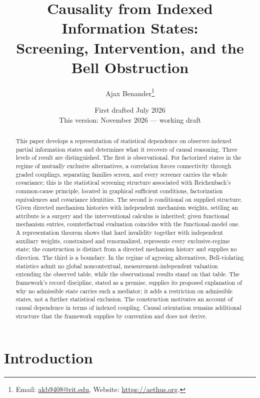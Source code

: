 \documentclass[11pt]{article}
\title{Causality from Indexed Information States:\\ \large Screening, Intervention, and the Bell Obstruction}
\author{Ajax Benander\thanks{Email: \href{mailto:akb9408@rit.edu}{akb9408@rit.edu}, Website: \url{https://aethus.org}.}}
\date{First drafted July 2026\\ {\small This version: November 2026 --- working draft}}
\begin{document}
\maketitle

\begin{abstract}
This paper develops a representation of statistical dependence on observer-indexed partial information states and determines what it recovers of causal reasoning. Three levels of result are distinguished. The first is observational. For factorized states in the regime of mutually exclusive alternatives, a correlation forces connectivity through graded couplings, separating families screen, and every screener carries the whole covariance; this is the statistical screening structure associated with Reichenbach's common-cause principle, located in graphical sufficient conditions, factorization equivalences and covariance identities. The second is conditional on supplied structure. Given directed mechanism histories with independent mechanism weights, settling an attribute is a surgery and the interventional calculus is inherited; given functional mechanism entries, counterfactual evaluation coincides with the functional-model one. A representation theorem shows that hard invalidity together with independent auxiliary weights, constrained and renormalized, represents every exclusive-regime state; the construction is distinct from a directed mechanism history and supplies no direction. The third is a boundary. In the regime of agreeing alternatives, Bell-violating statistics admit no global noncontextual, measurement-independent valuation extending the observed table, while the observational results stand on that table. The framework's record discipline, stated as a premise, supplies its proposed explanation of why no admissible state carries such a mediator; it adds a restriction on admissible states, not a further statistical exclusion. The construction motivates an account of causal dependence in terms of indexed coupling. Causal orientation remains additional structure that the framework supplies by convention and does not derive.
\end{abstract}

\section{Introduction}
\label{sec:intro}
\end{document}
